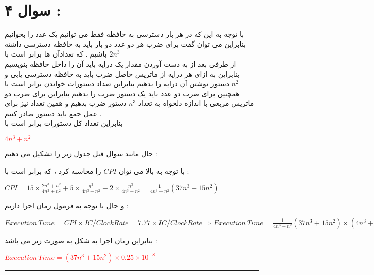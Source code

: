 \documentclass{article}
\begin{document}
\section*{سوال ۴ : }
با توجه به این که در هر بار دسترسی به حافظه فقط می توانیم یک عدد را بخوانیم بنابراین می توان گفت برای ضرب هر دو عدد دو بار باید به حافظه دسترسی داشته باشیم  . که تعدادآن ها برابر است با 
$2n^3$
\\
از طرفی بعد از به دست آوردن مقدار یک درایه باید آن را داخل حافظه بنویسیم بنابراین به ازای هر درایه از ماتریس حاصل ضرب باید به حافظه دسترسی یابی و دستور نوشتن آن درایه را بدهیم بنابراین تعداد دستورات خواندن برابر است با 
$n^2$
\\
همچنین برای ضرب دو عدد باید یک دستور ضرب را بدهیم بنابراین برای ضرب دو ماتریس مربعی با اندازه دلخواه به تعداد 
$n^3$
دستور ضرب بدهیم و همین تعداد نیز برای عمل جمع باید دستور صادر کنیم  . 
\\
بنابراین تعداد کل دستورات برابر است با 
\begin{center}
\textcolor{red}{$4n^3+n^2$}
\end{center}

حال مانند سوال قبل جدول زیر را تشکیل می دهیم  : 
\begin{center}
	\begin{table}[h]
		\centering
	\end{table}
\end{center}
با توجه به بالا می توان 
$CPI$
را محاسبه کرد ، که برابر است با   : 
\begin{center}
	$ CPI =15 \times \frac{2n^3+n^2}{4n^3+n^2} +5 \times  \frac{n^3}{4n^3+n^2} + 2 \times  \frac{n^3}{4n^3+n^2}  = \frac{1}{4n^3+n^2}(37n^3+15n^2) $
\end{center}
و حال با توجه به فرمول زمان اجرا داریم : 
\begin{center}
	$ Execution \ Time  = CPI \times IC /  Clock Rate =7.77  \times IC  / Clock Rate \Rightarrow Execution \ Time  =  \frac{1}{4n^3+n^2}(37n^3+15n^2) \times (4n^3+n^2)\times 0.25 \times 10^{-8}$
\end{center}
بنابراین زمان اجرا به شکل به صورت زیر می باشد   : 
\begin{center}
	\textcolor{red}{$Execution \ Time = (37n^3+15n^2) \times 0.25 \times 10^{-8}$}
\end{center}
	\hrule
\end{document}
